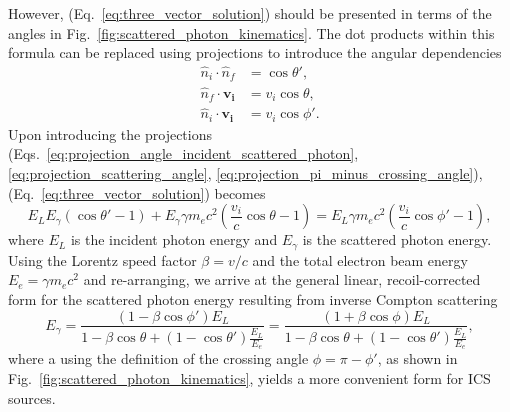 \documentclass[../main.tex]{subfiles}
\begin{document}
However, (Eq.~\ref{eq:three_vector_solution}) should be presented in terms of the angles in Fig.~\ref{fig:scattered_photon_kinematics}. The dot products within this formula can be replaced using projections to introduce the angular dependencies
\begin{align}
\hat{n}_{i}\cdot\hat{n}_{f} &= \cos\theta',
\label{eq:projection_angle_incident_scattered_photon}\\
\hat{n}_{f}\cdot \boldsymbol{v_{i}} &= v_{i}\cos\theta,
\label{eq:projection_scattering_angle}\\
\hat{n}_{i}\cdot \boldsymbol{v_{i}} &= v_{i}\cos\phi'.
\label{eq:projection_pi_minus_crossing_angle}
\end{align}
Upon introducing the projections (Eqs.~\ref{eq:projection_angle_incident_scattered_photon}, \ref{eq:projection_scattering_angle}, \ref{eq:projection_pi_minus_crossing_angle}), (Eq.~\ref{eq:three_vector_solution}) becomes
\begin{equation}
E_{L}E_{\gamma}\left(\cos\theta'-1\right)+E_{\gamma}\gamma m_{e}c^{2}\left(\frac{v_{i}}{c}\cos\theta-1\right) = E_{L}\gamma m_{e}c^{2}\left( \frac{v_{i}}{c}\cos\phi'-1\right),
\label{eq:three_vector_solution_projections}
\end{equation}
where $E_{L}$ is the incident photon energy and $E_{\gamma}$ is the scattered photon energy. Using the Lorentz speed factor $\beta = v/c$ and the total electron beam energy $E_{e} = \gamma m_{e}c^{2}$ and re-arranging, we arrive at the general linear, recoil-corrected form for the scattered photon energy resulting from inverse Compton scattering 
\begin{equation}
E_{\gamma} = \frac{\left(1-\beta\cos\phi'\right)E_{L}}{1-\beta\cos\theta+\left(1-\cos\theta'\right)\frac{E_{L}}{E_{e}}} = \frac{\left(1+\beta\cos\phi\right)E_{L}}{1-\beta\cos\theta+\left(1-\cos\theta'\right)\frac{E_{L}}{E_{e}}},
\label{eq:scattered_photon_energy}
\end{equation}
where a using the definition of the crossing angle $\phi=\pi-\phi'$, as shown in Fig.~\ref{fig:scattered_photon_kinematics}, yields a more convenient form for ICS sources.   
  
\end{document}
